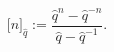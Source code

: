 \begin{equation}
\lbrack n]_{\hat{q}}:=\frac{\hat{q}^{n}-\hat{q}^{-n}}{\hat{q}-\hat{q}^{-1}}%
.\qquad \quad
\end{equation}%
